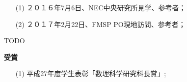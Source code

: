 \documentclass[a4j,twocolumn]{jarticle}
\begin{document}
\begin{enumerate}
	\item [(1)] ２０１６年7月6日、NEC中央研究所見学、参考者；
	\item [(2)] ２０１７年2月22日、FMSP PO現地訪問、参考者；
\end{enumerate}
TODO

\vspace{0.2cm}
\noindent
{\bf 受賞}

\vspace{0.1cm}
\begin{enumerate}
	\item[(1)] 平成27年度学生表彰「数理科学研究科長賞」;
\end{enumerate}

\vspace{0.4cm}

\end{document}
